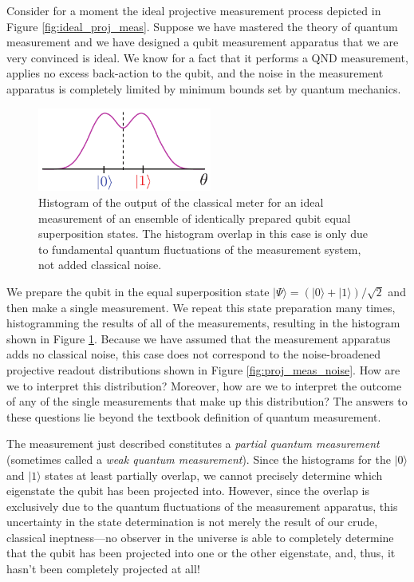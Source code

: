 Consider for a moment the ideal projective measurement process depicted in Figure \ref{fig:ideal_proj_meas}.  Suppose we have mastered the theory of quantum measurement and we have designed a qubit measurement apparatus that we are very convinced is ideal.  We know for a fact that it performs a QND measurement, applies no excess back-action to the qubit, and the noise in the measurement apparatus is completely limited by minimum bounds set by quantum mechanics.

\begin{figure}
\begin{center}
	\includegraphics[width = 2.25in]{qmeas_chapter/ideal_partial_meas}
\end{center}
\caption[Partial measurement histograms]{Histogram of the output of the classical meter for an ideal measurement of an ensemble of identically prepared qubit equal superposition states.  The histogram overlap in this case is only due to fundamental quantum fluctuations of the measurement system, not added classical noise.}
\label{fig:ideal_partial_meas}
\end{figure}

We prepare the qubit in the equal superposition state $|\Psi\rangle = (|0\rangle + |1\rangle)/\sqrt{2}$ and then make a single measurement.  We repeat this state preparation many times, histogramming the results of all of the measurements, resulting in the histogram shown in Figure \ref{fig:ideal_partial_meas}.  Because we have assumed that the measurement apparatus adds no classical noise, this case does not correspond to the noise-broadened projective readout distributions shown in Figure \ref{fig:proj_meas_noise}.  How are we to interpret this distribution?  Moreover, how are we to interpret the outcome of any of the single measurements that make up this distribution?  The answers to these questions lie beyond the textbook definition of quantum measurement.

The measurement just described constitutes a \textit{partial quantum measurement} (sometimes called a \textit{weak quantum measurement}).  Since the histograms for the $|0\rangle$ and $|1\rangle$ states at least partially overlap, we cannot precisely determine which eigenstate the qubit has been projected into.  However, since the overlap is exclusively due to the quantum fluctuations of the measurement apparatus, this uncertainty in the state determination is not merely the result of our crude, classical ineptness---no observer in the universe is able to completely determine that the qubit has been projected into one or the other eigenstate, and, thus, it hasn't been completely projected at all!

